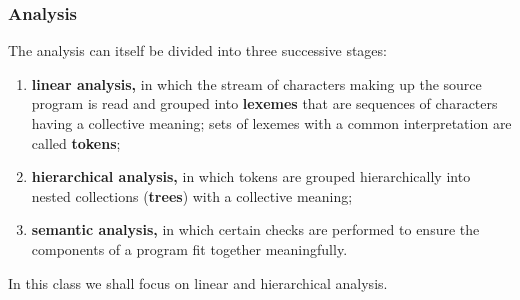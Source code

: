 %
\begin{frame}
\frametitle{Analysis}

The analysis can itself be divided into three successive stages:
\begin{enumerate}

  \item \textbf{linear analysis,} in which the stream of characters
    making up the source program is read and grouped into
    \textbf{lexemes} that are sequences of characters having a
    collective meaning; sets of lexemes with a common interpretation
    are called \textbf{tokens};

  \item \textbf{hierarchical analysis,} in which tokens are grouped
    hierarchically into nested collections (\textbf{trees}) with a
    collective meaning;

  \item \textbf{semantic analysis,} in which certain checks are
    performed to ensure the components of a program fit together
    meaningfully.

\end{enumerate}
In this class we shall focus on linear and hierarchical analysis.

\end{frame}

